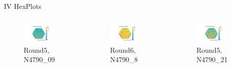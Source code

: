 \documentclass{beamer}
\begin{document}
\begin{frame}{IV HexPlots}
\begin{columns}
    \begin{figure}
      \includegraphics[width=0.7\textwidth]{plots/N4790_09.pdf}
      \caption{Round5, N4790\_09}
    \end{figure}

    \begin{figure}
      \includegraphics[width=0.7\textwidth]{plots/N4790_8.pdf}
      \caption{Round6, N4790\_8}
    \end{figure}

    \begin{figure}
      \includegraphics[width=0.7\textwidth]{plots/N4790_21.pdf}
      \caption{Round5, N4790\_21}
    \end{figure}


\end{columns}
\end{frame}
\end{document}
